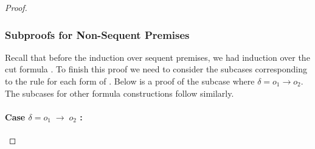 \begin{proof}
%



\subsubsection{Subproofs for Non-Sequent Premises}

Recall that before the induction over sequent premises, we had induction over the cut formula \delta. To finish this proof we need to consider the subcases corresponding to the \rlnmsinit{} rule for each form of \delta.
Below is a proof of the \rlnmsinit{} subcase where $\delta = o_1 \longrightarrow o_2$. The \rlnmsinit{} subcases for other formula constructions follow similarly.
%
\paragraph{Case $\delta = o_1 \; \longrightarrow \; o_2$ :}


\end{proof}
